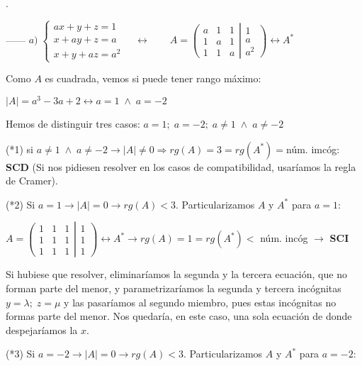 \begin{proofw}\renewcommand{\qedsymbol}{$\diamond$}.

------ $a)\;  \begin{cases}   ax+y+z=1\\x+ay+z=a\\x+y+az=a^2       \end{cases}\quad \leftrightarrow \qquad A= \left( \begin{matrix} a&1&1\\1&a&1\\1&1&a \end{matrix} \right| \left. \begin{matrix} 1\\a\\a^2 \end{matrix} \right) \leftrightarrow A^*$

Como $A$ es cuadrada, vemos si puede tener rango máximo: 

$|A|=a^3-3a+2 \leftrightarrow a=1\; \wedge  \;a=-2 $

Hemos de distinguir tres casos: $a=1; \; a=-2; \; a\neq 1 \; \wedge \; a\neq -2$

(*1) si $a\neq 1 \; \wedge \; a\neq -2 \to |A|\neq 0 \Rightarrow rg(A)=3=rg(A^*)=$núm. imcóg: \textbf{SCD} \textcolor{gris}{(Si nos pidiesen resolver en los casos de compatibilidad, usaríamos la regla de Cramer).}

(*2) Si $a=1 \to |A|=0\to rg(A)<3$. Particularizamos $A$ y $A^*$ para $a=1$:

\noindent $A= \left( \begin{matrix} \boxed{1}&1&1\\1&1&1\\1&1&1 \end{matrix} \right| \left. \begin{matrix} 1\\1\\1 \end{matrix} \right) \leftrightarrow A^* \to rg(A)=1=rg(A^*) < $ núm. incóg  $\to$ \textbf{SCI}

\noindent \textcolor{gris}{Si hubiese que resolver, eliminaríamos la segunda y la tercera ecuación, que no forman parte del menor, y parametrizaríamos la segunda y tercera incógnitas $y=\lambda; \; z=\mu$ y las pasaríamos al segundo miembro, pues estas incógnitas no formas parte del menor. Nos quedaría, en este caso, una sola ecuación de donde despejaríamos la $x$.}

(*3) Si $a=-2 \to |A|=0\to rg(A)<3$. Particularizamos $A$ y $A^*$ para $a=-2$:


\end{proofw}
